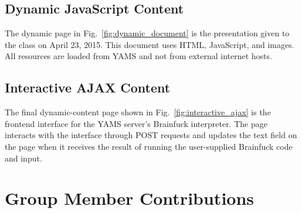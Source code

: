 \documentclass[journal,10pt]{IEEEtran}
\begin{document}
\subsection{Dynamic JavaScript Content}

The dynamic page in Fig.~\ref{fig:dynamic_document} is the presentation given to the class on April 23, 2015. This document uses HTML, JavaScript, and images. All resources are loaded from YAMS and not from external internet hosts.

\subsection{Interactive AJAX Content}

The final dynamic-content page shown in Fig.~\ref{fig:interactive_ajax} is the frontend interface for the YAMS server's Brainfuck\cite{Mpreu/preller} interpreter. The page interacts with the interface through POST requests and updates the text field on the page when it receives the result of running the user-supplied Brainfuck code and input.

\section{Group Member Contributions}
\end{document}
